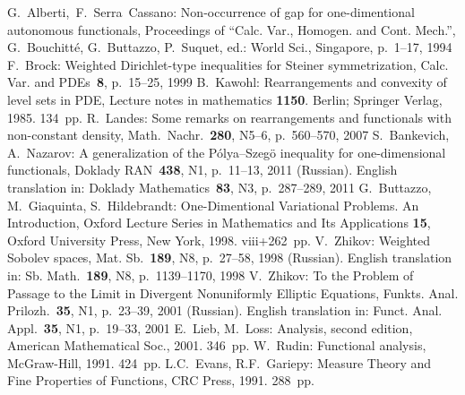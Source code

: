 \documentclass[12pt]{article}
\begin{document}
\begin{thebibliography}{99}
 G.~Alberti,~F.~Serra~Cassano: Non-occurrence of gap for one-dimentional autonomous functionals,
Proceedings of ``Calc. Var., Homogen. and Cont. Mech.'', G.~Bouchitt\'e, G.~Buttazzo, P.~Suquet, ed.: World Sci., Singapore, p.~1--17, 1994
 F.~Brock: Weighted Dirichlet-type inequalities for Steiner symmetrization,
Calc. Var. and PDEs~{\bf8}, p.~15--25, 1999
 B.~Kawohl: Rearrangements and convexity of level sets in PDE,
Lecture notes in mathematics {\bf1150}. Berlin; Springer Verlag, 1985. 134~pp.
 R.~Landes: Some remarks on rearrangements and functionals with non-constant density,
Math.~Nachr.~{\bf280}, N5--6, p.~560--570, 2007
 S.~Bankevich, A.~Nazarov: A generalization of the P\'olya--Szeg\"o inequality for one-dimensional functionals,
Doklady RAN~{\bf438}, N1, p.~11--13, 2011 (Russian).
English translation in:
Doklady Mathematics~{\bf83}, N3, p.~287--289, 2011
 G.~Buttazzo, M.~Giaquinta, S.~Hildebrandt: One-Dimentional Variational Problems. An Introduction,
Oxford Lecture Series in Mathematics and Its Applications {\bf15},
Oxford University Press, New York, 1998. viii+262~pp.
 V.~Zhikov: Weighted Sobolev spaces,
Mat. Sb.~{\bf189}, N8, p.~27--58, 1998 (Russian).
English translation in:
Sb. Math.~{\bf189}, N8, p.~1139--1170, 1998
 V.~Zhikov: To the Problem of Passage to the Limit in Divergent Nonuniformly Elliptic Equations,
Funkts. Anal. Prilozh.~{\bf35}, N1, p.~23--39, 2001 (Russian).
English translation in:
Funct. Anal. Appl.~{\bf35}, N1, p.~19--33, 2001
 E.~Lieb, M.~Loss: Analysis, second edition,
American Mathematical Soc., 2001. 346~pp.
 W.~Rudin: Functional analysis,
McGraw-Hill, 1991. 424~pp.
 L.C.~Evans, R.F.~Gariepy: Measure Theory and Fine Properties of Functions,
CRC Press, 1991. 288~pp.

\end{thebibliography}
\end{document}
